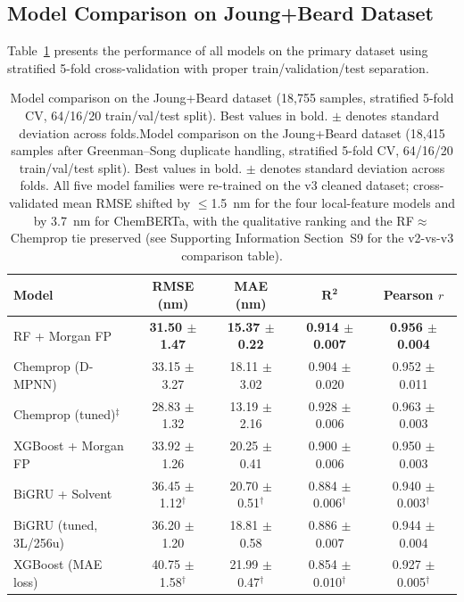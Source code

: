 \documentclass[journal=jcisd8,manuscript=article]{achemso}
\newcommand{\added}[1]{{\color{addedblue}#1}}
\newcommand{\removed}[1]{{\color{removedred}#1}}
\begin{document}
\subsection{Model Comparison on Joung+Beard Dataset}
\label{sec:model_comparison}

Table~\ref{tab:model_comparison} presents the performance of all models on the primary dataset using stratified 5-fold cross-validation with proper train/validation/test separation.

\begin{table}[htbp]
\centering
\caption{\removed{Model comparison on the Joung+Beard dataset (18,755 samples, stratified 5-fold CV, 64/16/20 train/val/test split). Best values in bold. $\pm$ denotes standard deviation across folds.}\added{Model comparison on the Joung+Beard dataset (18,415 samples after Greenman--Song duplicate handling, stratified 5-fold CV, 64/16/20 train/val/test split). Best values in bold. $\pm$ denotes standard deviation across folds. All five model families were re-trained on the v3 cleaned dataset; cross-validated mean RMSE shifted by $\leq$1.5~nm for the four local-feature models and by 3.7~nm for ChemBERTa, with the qualitative ranking and the RF$\approx$Chemprop tie preserved (see Supporting Information Section~S9 for the v2-vs-v3 comparison table).}}
\label{tab:model_comparison}
\small
\setlength{\tabcolsep}{4pt}
\added{%
\begin{tabular}{lcccc}
\toprule
\textbf{Model} & \textbf{RMSE (nm)} & \textbf{MAE (nm)} & $\boldsymbol{R^2}$ & \textbf{Pearson $r$} \\
\midrule
RF + Morgan FP & \textbf{31.50 $\pm$ 1.47} & \textbf{15.37 $\pm$ 0.22} & \textbf{0.914 $\pm$ 0.007} & \textbf{0.956 $\pm$ 0.004} \\
Chemprop (D-MPNN) & 33.15 $\pm$ 3.27 & 18.11 $\pm$ 3.02 & 0.904 $\pm$ 0.020 & 0.952 $\pm$ 0.011 \\
Chemprop (tuned)$^{\ddagger}$ & 28.83 $\pm$ 1.32 & 13.19 $\pm$ 2.16 & 0.928 $\pm$ 0.006 & 0.963 $\pm$ 0.003 \\
XGBoost + Morgan FP & 33.92 $\pm$ 1.26 & 20.25 $\pm$ 0.41 & 0.900 $\pm$ 0.006 & 0.950 $\pm$ 0.003 \\
BiGRU + Solvent & 36.45 $\pm$ 1.12$^{\dagger}$ & 20.70 $\pm$ 0.51$^{\dagger}$ & 0.884 $\pm$ 0.006$^{\dagger}$ & 0.940 $\pm$ 0.003$^{\dagger}$ \\
BiGRU (tuned, 3L/256u)& 36.20 $\pm$ 1.20 & 18.81 $\pm$ 0.58 & 0.886 $\pm$ 0.007 & 0.944 $\pm$ 0.004 \\
XGBoost (MAE loss) & 40.75 $\pm$ 1.58$^{\dagger}$ & 21.99 $\pm$ 0.47$^{\dagger}$ & 0.854 $\pm$ 0.010$^{\dagger}$ & 0.927 $\pm$ 0.005$^{\dagger}$ \\

\end{tabular}}
\end{table}
\end{document}
